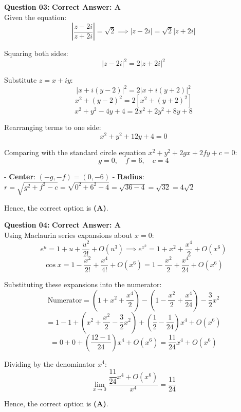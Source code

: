 \documentclass[11pt,a4paper]{article}
\begin{document}
\begin{tcolorbox}[solbox]
\textbf{\textcolor{primaryDark}{Question 03:}} \hfill \textbf{\textcolor{l1Green}{Correct Answer: A}}\\
\vspace{4pt}
Given the equation:
$$\left|\frac{z - 2i}{z + 2i}\right| = \sqrt{2} \implies |z - 2i| = \sqrt{2}|z + 2i|$$

Squaring both sides:
$$|z - 2i|^2 = 2|z + 2i|^2$$

Substitute $z = x + iy$:
$$|x + i(y - 2)|^2 = 2|x + i(y + 2)|^2$$
$$x^2 + (y - 2)^2 = 2\left[x^2 + (y + 2)^2\right]$$
$$x^2 + y^2 - 4y + 4 = 2x^2 + 2y^2 + 8y + 8$$

Rearranging terms to one side:
$$x^2 + y^2 + 12y + 4 = 0$$

Comparing with the standard circle equation $x^2 + y^2 + 2gx + 2fy + c = 0$:
$$g = 0, \quad f = 6, \quad c = 4$$

- \textbf{Center}: $(-g, -f) = (0, -6)$
- \textbf{Radius}: $r = \sqrt{g^2 + f^2 - c} = \sqrt{0^2 + 6^2 - 4} = \sqrt{36 - 4} = \sqrt{32} = 4\sqrt{2}$

Hence, the correct option is \textbf{(A)}.
\end{tcolorbox}

\begin{tcolorbox}[solbox]
\textbf{\textcolor{primaryDark}{Question 04:}} \hfill \textbf{\textcolor{l1Green}{Correct Answer: A}}\\
\vspace{4pt}
Using Maclaurin series expansions about $x = 0$:
$$e^{u} = 1 + u + \frac{u^2}{2!} + O(u^3) \implies e^{x^2} = 1 + x^2 + \frac{x^4}{2} + O(x^6)$$
$$\cos x = 1 - \frac{x^2}{2!} + \frac{x^4}{4!} + O(x^6) = 1 - \frac{x^2}{2} + \frac{x^4}{24} + O(x^6)$$

Substituting these expansions into the numerator:
$$\text{Numerator} = \left(1 + x^2 + \frac{x^4}{2}\right) - \left(1 - \frac{x^2}{2} + \frac{x^4}{24}\right) - \frac{3}{2}x^2$$
$$= 1 - 1 + \left(x^2 + \frac{x^2}{2} - \frac{3}{2}x^2\right) + \left(\frac{1}{2} - \frac{1}{24}\right)x^4 + O(x^6)$$
$$= 0 + 0 + \left(\frac{12 - 1}{24}\right)x^4 + O(x^6) = \frac{11}{24}x^4 + O(x^6)$$

Dividing by the denominator $x^4$:
$$\lim_{x \to 0} \frac{\dfrac{11}{24}x^4 + O(x^6)}{x^4} = \frac{11}{24}$$

Hence, the correct option is \textbf{(A)}.
\end{tcolorbox}
\end{document}
